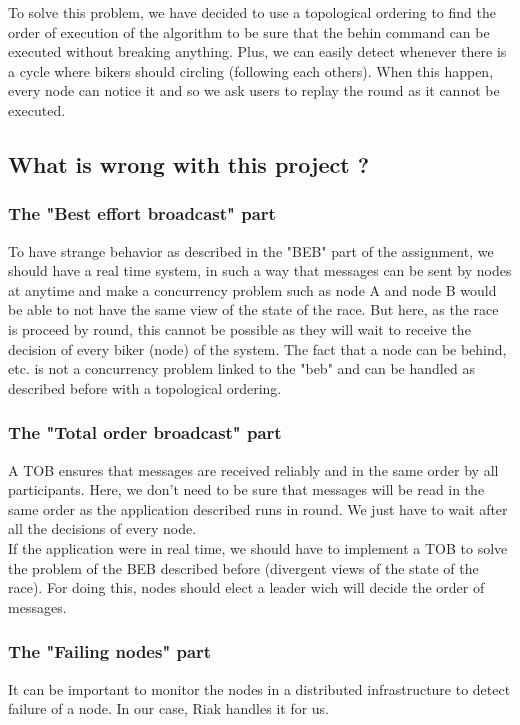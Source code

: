 \documentclass[a4paper, 11pt]{article}
\begin{document}
To solve this problem, we have decided to use a topological ordering to find the order of execution of the algorithm to be sure that the behin command can be executed without breaking anything. Plus, we can easily detect whenever there is a cycle where bikers should circling (following each others). When this happen, every node can notice it and so we ask users to replay the round as it cannot be executed. \\

\subsection{What is wrong with this project ?}

\subsubsection{The "Best effort broadcast" part}
To have strange behavior as described in the "BEB" part of the assignment, we should have a real time system, in such a way that messages can be sent by nodes at anytime and make a concurrency problem such as node A and node B would be able to not have the same view of the state of the race. But here, as the race is proceed by round, this cannot be possible as they will wait to receive the decision of every biker (node) of the system. The fact that a node can be behind, etc. is not a concurrency problem linked to the "beb" and can be handled as described before with a topological ordering.

\subsubsection{The "Total order broadcast" part}
A TOB ensures that messages are received reliably and in the same order by all participants. Here, we don't need to be sure that messages will be read in the same order as the application described runs in round. We just have to wait after all the decisions of every node. \\

If the application were in real time, we should have to implement a TOB to solve the problem of the BEB described before (divergent views of the state of the race). For doing this, nodes should elect a leader wich will decide the order of messages.

\subsubsection{The "Failing nodes" part}
It can be important to monitor the nodes in a distributed infrastructure to detect failure of a node. In our case, Riak handles it for us. \\
\end{document}
